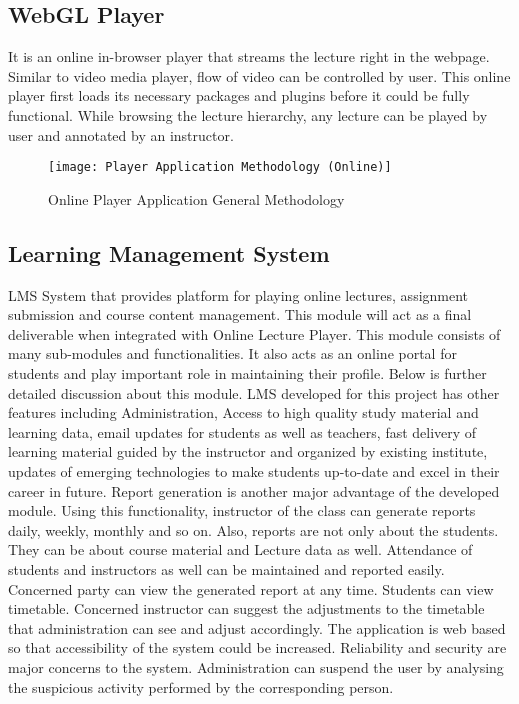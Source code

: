 \subsection{WebGL Player}
It is an online in-browser player that streams the lecture right in the webpage. Similar to video media player, flow of video can be controlled by user. This online player first loads its necessary packages and plugins before it could be fully functional. While browsing the lecture hierarchy, any lecture can be played by user and annotated by an instructor.

\begin{figure}[h]
  \centering
  \texttt{[image: Player Application Methodology (Online)]}
  \caption{Online Player Application General Methodology}
\end{figure}

\newpage
\subsection{Learning Management System}
LMS System that provides platform for playing online lectures, assignment submission and course content management. This module will act as a final deliverable when integrated with Online Lecture Player. This module consists of many sub-modules and functionalities. It also acts as an online portal for students and play important role in maintaining their profile. Below is further detailed discussion about this module. LMS developed for this project has other features including Administration, Access to high quality study material and learning data, email updates for students as well as teachers, fast delivery of learning material guided by the instructor and organized by existing institute, updates of emerging technologies to make students up-to-date and excel in their career in future. Report generation is another major advantage of the developed module. Using this functionality, instructor of the class can generate reports daily, weekly, monthly and so on. Also, reports are not only about the students. They can be about course material and Lecture data as well. Attendance of students and instructors as well can be maintained and reported easily. Concerned party can view the generated report at any time. Students can view timetable. Concerned instructor can suggest the adjustments to the timetable that administration can see and adjust accordingly. The application is web based so that accessibility of the system could be increased. Reliability and security are major concerns to the system. Administration can suspend the user by analysing the suspicious activity performed by the corresponding person.
